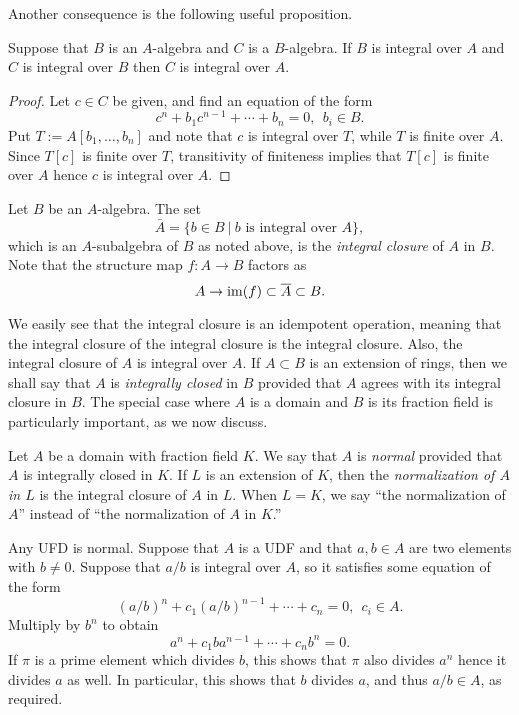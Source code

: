 Another consequence is the following useful proposition.
\begin{proposition}
  Suppose that $B$ is an $A$-algebra and $C$ is a $B$-algebra.
  If $B$ is integral over $A$ and $C$ is integral over $B$ then $C$ is integral over $A$.
\end{proposition}
\begin{proof}
  Let $c \in C$ be given, and find an equation of the form
  \[ c^{n} + b_{1} c^{n-1} + \cdots + b_{n} = 0, \ \ b_{i} \in B. \]
  Put $T := A[b_{1},\ldots,b_{n}]$ and note that $c$ is integral over $T$, while $T$ is finite over $A$.
  Since $T[c]$ is finite over $T$, transitivity of finiteness implies that $T[c]$ is finite over $A$ hence $c$ is integral over $A$.
\end{proof}

\begin{definition}
  Let $B$ be an $A$-algebra.
  The set
  \[ \bar A = \{b \in B \ | \ \text{$b$ is integral over $A$}\}, \]
  which is an $A$-subalgebra of $B$ as noted above, is the \emph{integral closure} of $A$ in $B$.
  Note that the structure map $f : A \to B$ factors as
  \[ A \to \operatorname{im}(f) \subset \overline A \subset B. \]
\end{definition}

We easily see that the integral closure is an idempotent operation, meaning that the integral closure of the integral closure is the integral closure.
Also, the integral closure of $A$ is integral over $A$.
If $A \subset B$ is an extension of rings, then we shall say that $A$ is \emph{integrally closed} in $B$ provided that $A$ agrees with its integral closure in $B$.
The special case where $A$ is a domain and $B$ is its fraction field is particularly important, as we now discuss.

\begin{definition}
  Let $A$ be a domain with fraction field $K$.
  We say that $A$ is \emph{normal} provided that $A$ is integrally closed in $K$.
  If $L$ is an extension of $K$, then the \emph{normalization of $A$ in $L$} is the integral closure of $A$ in $L$.
  When $L = K$, we say ``the normalization of $A$'' instead of ``the normalization of $A$ in $K$.''
\end{definition}

\begin{example}
  Any UFD is normal.
  Suppose that $A$ is a UDF and that $a,b \in A$ are two elements with $b \neq 0$.
  Suppose that $a/b$ is integral over $A$, so it satisfies some equation of the form
  \[ (a/b)^{n} + c_{1} (a/b)^{n-1} + \cdots + c_{n} = 0, \ \ c_{i} \in A. \]
  Multiply by $b^{n}$ to obtain
  \[ a^{n} + c_{1} b a^{n-1} + \cdots + c_{n} b^{n} = 0. \]
  If $\pi$ is a prime element which divides $b$, this shows that $\pi$ also divides $a^{n}$ hence it divides $a$ as well.
  In particular, this shows that $b$ divides $a$, and thus $a/b \in A$, as required.
\end{example}

